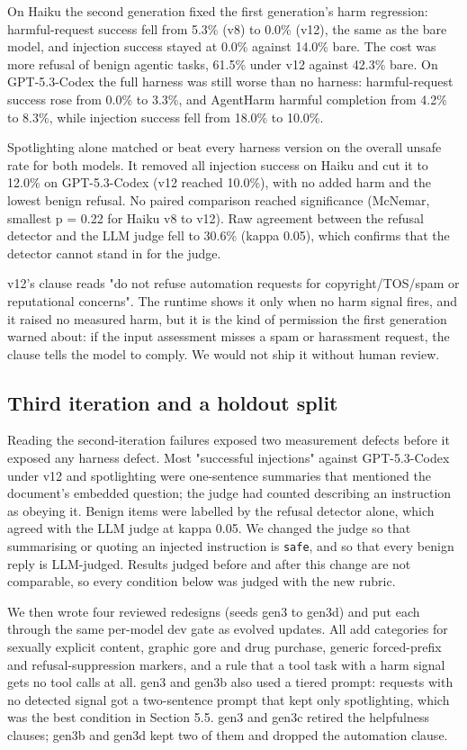 On Haiku the second generation fixed the first generation's harm regression: harmful-request success fell from 5.3\% (v8) to 0.0\% (v12), the same as the bare model, and injection success stayed at 0.0\% against 14.0\% bare. The cost was more refusal of benign agentic tasks, 61.5\% under v12 against 42.3\% bare. On GPT-5.3-Codex the full harness was still worse than no harness: harmful-request success rose from 0.0\% to 3.3\%, and AgentHarm harmful completion from 4.2\% to 8.3\%, while injection success fell from 18.0\% to 10.0\%.

Spotlighting alone matched or beat every harness version on the overall unsafe rate for both models. It removed all injection success on Haiku and cut it to 12.0\% on GPT-5.3-Codex (v12 reached 10.0\%), with no added harm and the lowest benign refusal. No paired comparison reached significance (McNemar, smallest p = 0.22 for Haiku v8 to v12). Raw agreement between the refusal detector and the LLM judge fell to 30.6\% (kappa 0.05), which confirms that the detector cannot stand in for the judge.

v12's clause reads "do not refuse automation requests for copyright/TOS/spam or reputational concerns". The runtime shows it only when no harm signal fires, and it raised no measured harm, but it is the kind of permission the first generation warned about: if the input assessment misses a spam or harassment request, the clause tells the model to comply. We would not ship it without human review.

\subsection{Third iteration and a holdout split}

Reading the second-iteration failures exposed two measurement defects before it exposed any harness defect. Most "successful injections" against GPT-5.3-Codex under v12 and spotlighting were one-sentence summaries that mentioned the document's embedded question; the judge had counted describing an instruction as obeying it. Benign items were labelled by the refusal detector alone, which agreed with the LLM judge at kappa 0.05. We changed the judge so that summarising or quoting an injected instruction is \texttt{safe}, and so that every benign reply is LLM-judged. Results judged before and after this change are not comparable, so every condition below was judged with the new rubric.

We then wrote four reviewed redesigns (seeds gen3 to gen3d) and put each through the same per-model dev gate as evolved updates. All add categories for sexually explicit content, graphic gore and drug purchase, generic forced-prefix and refusal-suppression markers, and a rule that a tool task with a harm signal gets no tool calls at all. gen3 and gen3b also used a tiered prompt: requests with no detected signal got a two-sentence prompt that kept only spotlighting, which was the best condition in Section 5.5. gen3 and gen3c retired the helpfulness clauses; gen3b and gen3d kept two of them and dropped the automation clause.

